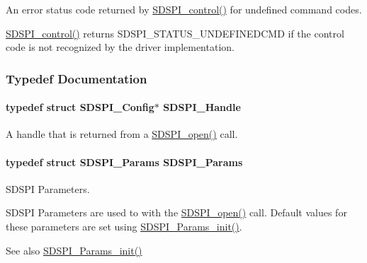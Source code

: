 An error status code returned by \hyperlink{_s_d_s_p_i_8h_a541a1db109382fe090ed7a9209a34f61}{S\+D\+S\+P\+I\+\_\+control()} for undefined command codes. 

\hyperlink{_s_d_s_p_i_8h_a541a1db109382fe090ed7a9209a34f61}{S\+D\+S\+P\+I\+\_\+control()} returns S\+D\+S\+P\+I\+\_\+\+S\+T\+A\+T\+U\+S\+\_\+\+U\+N\+D\+E\+F\+I\+N\+E\+D\+C\+M\+D if the control code is not recognized by the driver implementation. 

\subsubsection{Typedef Documentation}
\paragraph[{S\+D\+S\+P\+I\+\_\+\+Handle}]{\setlength{\rightskip}{0pt plus 5cm}typedef struct {\bf S\+D\+S\+P\+I\+\_\+\+Config}$\ast$ {\bf S\+D\+S\+P\+I\+\_\+\+Handle}}\label{_s_d_s_p_i_8h_abd3d22133d60c2e5afd49722d6bafb7e}


A handle that is returned from a \hyperlink{_s_d_s_p_i_8h_af4a5ca9bb35e8a7df02acf20ceeae66d}{S\+D\+S\+P\+I\+\_\+open()} call. 

\paragraph[{S\+D\+S\+P\+I\+\_\+\+Params}]{\setlength{\rightskip}{0pt plus 5cm}typedef struct {\bf S\+D\+S\+P\+I\+\_\+\+Params}  {\bf S\+D\+S\+P\+I\+\_\+\+Params}}\label{_s_d_s_p_i_8h_a3fd9e0fa28415b0c0cf6ab03c37ca4d1}


S\+D\+S\+P\+I Parameters. 

S\+D\+S\+P\+I Parameters are used to with the \hyperlink{_s_d_s_p_i_8h_af4a5ca9bb35e8a7df02acf20ceeae66d}{S\+D\+S\+P\+I\+\_\+open()} call. Default values for these parameters are set using \hyperlink{_s_d_s_p_i_8h_a6fe24eaba1cca88242c5df360a074ca8}{S\+D\+S\+P\+I\+\_\+\+Params\+\_\+init()}.

\begin{DoxySeeAlso}{See also}
\hyperlink{_s_d_s_p_i_8h_a6fe24eaba1cca88242c5df360a074ca8}{S\+D\+S\+P\+I\+\_\+\+Params\+\_\+init()} 
\end{DoxySeeAlso}
